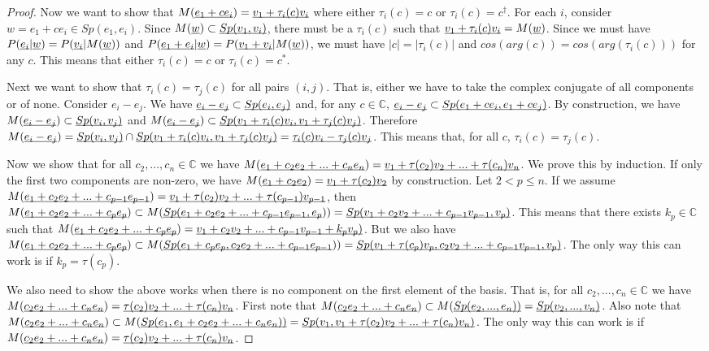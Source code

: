 \documentclass[aps,prl,amsmath,amssymb,twocolumn,nofootinbib]{revtex4}
\theoremstyle{plain}
\theoremstyle{definition}
\theoremstyle{remark}
\newcommand{\pj}[1] {\underbar{$#1$}}
\begin{document}
\begin{proof}
		Now we want to show that $M(\pj{e_1 + c e_i})=\pj{v_1 + \tau_i(c)
			v_i}$ where either $\tau_i(c) = c$ or $\tau_i(c) = c^\dagger$. For
		each $i$, consider $w = e_1 + c e_i \in Sp(e_1, e_i)$. Since
		$M(\pj{w}) \subset \pj{Sp(v_1, v_i)}$, there must be a $\tau_i(c)$
		such that $\pj{v_1 + \tau_i(c) v_i} = M(\pj{w})$. Since we must have
		$P(\pj{e_i} | \pj{w}) = P(\pj{v_i} | M(\pj{w}))$ and $P(\pj{e_1 +
			e_i} | \pj{w}) = P(\pj{v_1 + v_i} | M(\pj{w}))$, we must have
		$|c| = |\tau_i(c)|$ and $cos(arg(c)) = cos(arg(\tau_i(c)))$ for any
		$c$. This means that either $\tau_i(c) = c$ or $\tau_i(c) =
		c^*$.
		
		Next we want to show that $\tau_i(c) = \tau_j(c)$ for all pairs $(i,j)$. That is, either we have to take the complex conjugate of all components or of none. Consider $e_i - e_j$. We have $\pj{e_i - e_j} \subset \pj{Sp(e_i, e_j)}$ and, for any $c \in \mathbb{C}$, $\pj{e_i - e_j} \subset \pj{Sp(e_1 + c e_i, e_1 + c e_j)}$. By construction, we have $M(\pj{e_i - e_j})\subset \pj{Sp(v_i, v_j)}$ and $M(\pj{e_i - e_j})\subset \pj{Sp(v_1 + \tau_i(c) v_i, v_1 + \tau_j(c) v_j)}$. Therefore $M(\pj{e_i - e_j}) = \pj{Sp(v_i, v_j)} \cap \pj{Sp(v_1 + \tau_i(c) v_i, v_1 + \tau_j(c) v_j)} = \pj{\tau_i(c) v_i - \tau_j(c) v_j}$. This means that, for all $c$, $\tau_i(c) = \tau_j(c)$.
		
		Now we show that for all $c_2, ..., c_n \in \mathbb{C}$ we have $M(\pj{e_1 + c_2 e_2 + ... + c_n e_n}) = \pj{v_1 + \tau(c_2) v_2 + ... + \tau(c_n) v_n}$. We prove this by induction. If only the first two components are non-zero, we have  $M(\pj{e_1 + c_2 e_2}) = \pj{v_1 + \tau(c_2) v_2}$ by construction. Let $2 < p \leq n$. If we assume $M(\pj{e_1 + c_2 e_2 + ... + c_{p-1} e_{p-1}}) = \pj{v_1 + \tau(c_2) v_2 + ... + \tau(c_{p-1}) v_{p-1}}$, then $M(\pj{e_1 + c_2 e_2 + ... + c_p e_p}) \subset M(\pj{Sp(e_1 + c_2 e_2 + ... + c_{p-1} e_{p-1}, e_p})) = \pj{Sp(v_1 + c_2 v_2 + ... + c_{p-1} v_{p-1}, v_p)}$. This means that there exists $k_p \in \mathbb{C}$ such that $M(\pj{e_1 + c_2 e_2 + ... + c_p e_p}) = \pj{v_1 + c_2 v_2 + ... + c_{p-1} v_{p-1} + k_p v_p)}$. But we also have $M(\pj{e_1 + c_2 e_2 + ... + c_p e_p}) \subset M(\pj{Sp(e_1 + c_p e_p, c_2 e_2 + ... + c_{p-1} e_{p-1}})) = \pj{Sp(v_1 + \tau(c_p) v_p, c_2 v_2 + ... + c_{p-1} v_{p-1}, v_p)}$. The only way this can work is if $k_p = \tau(c_p)$.
		
		We also need to show the above works when there is no component on the first element of the basis. That is, for all $c_2, ..., c_n \in \mathbb{C}$ we have $M(\underbar{$c_2 e_2 + ... + c_n e_n$}) = \underbar{$\tau(c_2) v_2 + ... + \tau(c_n) v_n$}$. First note that $M(\underbar{$c_2 e_2 + ... + c_n e_n$}) \subset M(\underbar{$Sp(e_2, ..., e_n)$)} = \underbar{$Sp(v_2, ..., v_n)$}$. Also note that $M(\underbar{$c_2 e_2 + ... + c_n e_n$}) \subset M(\underbar{$Sp(e_1, e_1 + c_2 e_2 + ... + c_n e_n)$)} = \underbar{$Sp(v_1, v_1 + \tau(c_2) v_2 + ... + \tau(c_n) v_n)$}$. The only way this can work is if $M(\underbar{$c_2 e_2 + ... + c_n e_n$}) = \underbar{$\tau(c_2) v_2 + ... + \tau(c_n) v_n$}$.
		

\end{proof}
\end{document}
